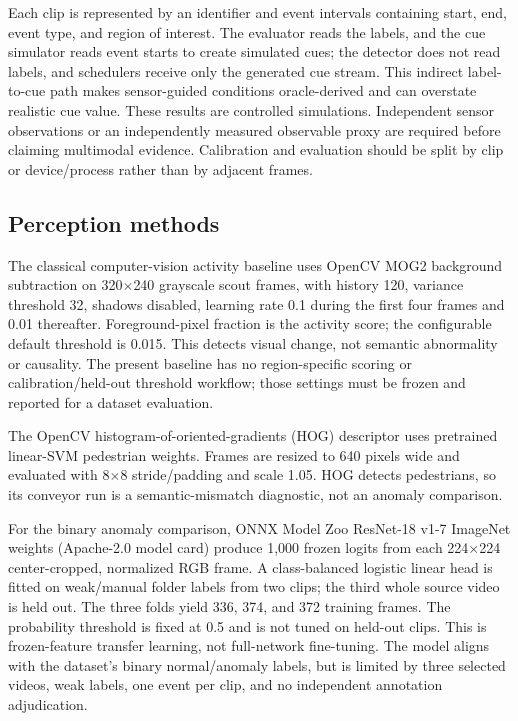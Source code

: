 \documentclass[conference]{IEEEtran}
\begin{document}
Each clip is represented by an identifier and event intervals containing start, end, event type, and region of interest. The evaluator reads the labels, and the cue simulator reads event starts to create simulated cues; the detector does not read labels, and schedulers receive only the generated cue stream. This indirect label-to-cue path makes sensor-guided conditions oracle-derived and can overstate realistic cue value. These results are controlled simulations. Independent sensor observations or an independently measured observable proxy are required before claiming multimodal evidence. Calibration and evaluation should be split by clip or device/process rather than by adjacent frames.

\subsection{Perception methods}
The classical computer-vision activity baseline uses OpenCV MOG2 background subtraction on 320$\times$240 grayscale scout frames, with history 120, variance threshold 32, shadows disabled, learning rate 0.1 during the first four frames and 0.01 thereafter. Foreground-pixel fraction is the activity score; the configurable default threshold is 0.015. This detects visual change, not semantic abnormality or causality. The present baseline has no region-specific scoring or calibration/held-out threshold workflow; those settings must be frozen and reported for a dataset evaluation.

The OpenCV histogram-of-oriented-gradients (HOG) descriptor uses pretrained linear-SVM pedestrian weights. Frames are resized to 640 pixels wide and evaluated with 8$\times$8 stride/padding and scale 1.05. HOG detects pedestrians, so its conveyor run is a semantic-mismatch diagnostic, not an anomaly comparison.

For the binary anomaly comparison, ONNX Model Zoo ResNet-18 v1-7 ImageNet weights (Apache-2.0 model card) produce 1,000 frozen logits from each 224$\times$224 center-cropped, normalized RGB frame. A class-balanced logistic linear head is fitted on weak/manual folder labels from two clips; the third whole source video is held out. The three folds yield 336, 374, and 372 training frames. The probability threshold is fixed at 0.5 and is not tuned on held-out clips. This is frozen-feature transfer learning, not full-network fine-tuning. The model aligns with the dataset's binary normal/anomaly labels, but is limited by three selected videos, weak labels, one event per clip, and no independent annotation adjudication.
\end{document}
